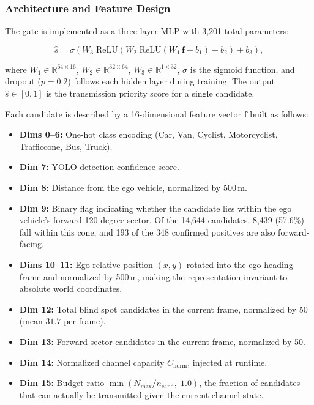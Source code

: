 \documentclass[12pt]{article}
\begin{document}
\subsubsection{Architecture and Feature Design}
\label{sec:gate_arch}

The gate is implemented as a three-layer MLP with 3{,}201 total parameters:

\begin{equation}
    \hat{s} = \sigma\!\left(
        W_3\;\text{ReLU}\!\left(
            W_2\;\text{ReLU}\!\left(W_1\,\mathbf{f} + b_1\right) + b_2
        \right) + b_3
    \right),
\end{equation}

\noindent where $W_1 \in \mathbb{R}^{64\times 16}$, $W_2 \in \mathbb{R}^{32\times 64}$, $W_3 \in \mathbb{R}^{1\times 32}$, $\sigma$ is the sigmoid function, and dropout ($p=0.2$) follows each hidden layer during training. The output $\hat{s} \in [0,1]$ is the transmission priority score for a single candidate.

\medskip
Each candidate is described by a 16-dimensional feature vector $\mathbf{f}$ built as follows:

\begin{itemize}[noitemsep]
    \item \textbf{Dims 0--6:} One-hot class encoding (Car, Van, Cyclist, Motorcyclist, Trafficcone, Bus, Truck).
    \item \textbf{Dim 7:} YOLO detection confidence score.
    \item \textbf{Dim 8:} Distance from the ego vehicle, normalized by 500\,m.
    \item \textbf{Dim 9:} Binary flag indicating whether the candidate lies within the ego vehicle's forward 120-degree sector. Of the 14{,}644 candidates, 8{,}439 (57.6\%) fall within this cone, and 193 of the 348 confirmed positives are also forward-facing.
    \item \textbf{Dims 10--11:} Ego-relative position $(x, y)$ rotated into the ego heading frame and normalized by 500\,m, making the representation invariant to absolute world coordinates.
    \item \textbf{Dim 12:} Total blind spot candidates in the current frame, normalized by 50 (mean $31.7$ per frame).
    \item \textbf{Dim 13:} Forward-sector candidates in the current frame, normalized by 50.
    \item \textbf{Dim 14:} Normalized channel capacity $C_{\text{norm}}$, injected at runtime.
    \item \textbf{Dim 15:} Budget ratio $\min(N_{\max}/n_{\text{cand}},\;1.0)$, the fraction of candidates that can actually be transmitted given the current channel state.
\end{itemize}
\end{document}
